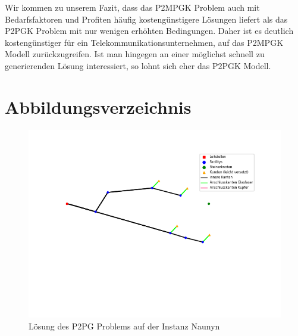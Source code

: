 \documentclass[11pt,a4paper]{article}
\theoremstyle{my_th_style1}
\begin{document}
Wir kommen zu unserem Fazit, dass das P2MPGK Problem auch mit Bedarfsfaktoren und Profiten h\"aufig kosteng\"unstigere L\"osungen liefert als das P2PGK Problem mit nur wenigen erh\"ohten Bedingungen.
Daher ist es deutlich kosteng\"unstiger f\"ur ein Telekommunikationsunternehmen, auf das P2MPGK Modell zur\"uckzugreifen.
Ist man hingegen an einer m\"oglichst schnell zu generierenden L\"osung interessiert, so lohnt sich eher das P2PGK Modell.
\newpage

\renewcommand{\refname}{Literaturverzeichnis}

\newpage
\appendix
\section*{Abbildungsverzeichnis}

\begin{figure}[!htbp]
	\begin{center}
		\begin{minipage}{10.0cm}
			\includegraphics[width=1\textwidth]{./Bilder/P2PG_Naunyn}
			\caption{Lösung des P2PG Problems auf der Instanz Naunyn}
			\label{fig:p2pg n pic}
		\end{minipage}
	\end{center}
\end{figure}
\end{document}
